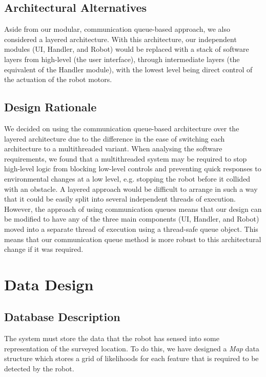 \documentclass[12pt,a4paper]{article}
\begin{document}
\subsection{Architectural Alternatives}
Aside from our modular, communication queue-based approach, we also considered a layered architecture. With this architecture, our independent modules (UI, Handler, and Robot) would be replaced with a stack of software layers from high-level (the user interface), through intermediate layers (the equivalent of the Handler module), with the lowest level being direct control of the actuation of the robot motors.

\subsection{Design Rationale}
We decided on using the communication queue-based architecture over the layered architecture due to the difference in the ease of switching each architecture to a multithreaded variant. When analysing the software requirements, we found that a multithreaded system may be required to stop high-level logic from blocking low-level controls and preventing quick responses to environmental changes at a low level, e.g. stopping the robot before it collided with an obstacle. A layered approach would be difficult to arrange in such a way that it could be easily split into several independent threads of execution. However, the approach of using communication queues means that our design can be modified to have any of the three main components (UI, Handler, and Robot) moved into a separate thread of execution using a thread-safe queue object. This means that our communication queue method is more robust to this architectural change if it was required.

\newpage
\section{Data Design}
\subsection{Database Description}
The system must store the data that the robot has sensed into some representation of the surveyed location. To do this, we have designed a \textit{Map} data structure which stores a grid of likelihoods for each feature that is required to be detected by the robot.
\end{document}
